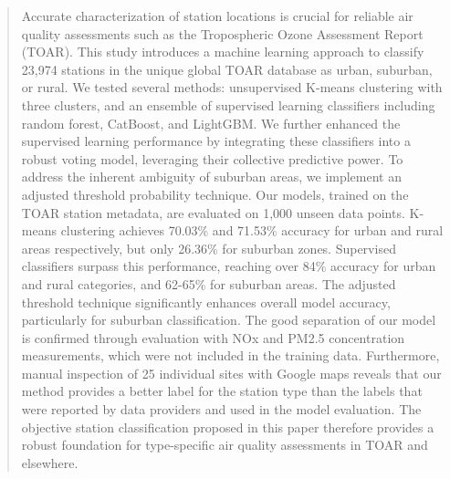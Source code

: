 \documentclass[gmd, manuscript]{copernicus}
\begin{document}
\begin{abstract}

Accurate characterization of station locations is crucial for reliable air quality assessments such as the Tropospheric Ozone Assessment Report (TOAR). This study introduces a machine learning approach to classify 23,974 stations in the unique global TOAR database as urban, suburban, or rural. We tested several methods: unsupervised K-means clustering with three clusters, and an ensemble of supervised learning classifiers including random forest, CatBoost, and LightGBM. We further enhanced the supervised learning performance by integrating these classifiers into a robust voting model, leveraging their collective predictive power. To address the inherent ambiguity of suburban areas, we implement an adjusted threshold probability technique. Our models, trained on the TOAR station metadata, are evaluated on 1,000 unseen data points. K-means clustering achieves 70.03\% and 71.53\% accuracy for urban and rural areas respectively, but only 26.36\% for suburban zones. Supervised classifiers surpass this performance, reaching over 84\% accuracy for urban and rural categories, and 62-65\% for suburban areas. The adjusted threshold technique significantly enhances overall model accuracy, particularly for suburban classification. The good separation of our model is confirmed through evaluation with NOx and PM2.5 concentration measurements, which were not included in the training data. Furthermore, manual inspection of 25 individual sites with Google maps reveals that our method provides a better label for the station type than the labels that were reported by data providers and used in the model evaluation. The objective station classification proposed in this paper therefore provides a robust foundation for type-specific air quality assessments in TOAR and elsewhere.

\end{abstract}
\end{document}
